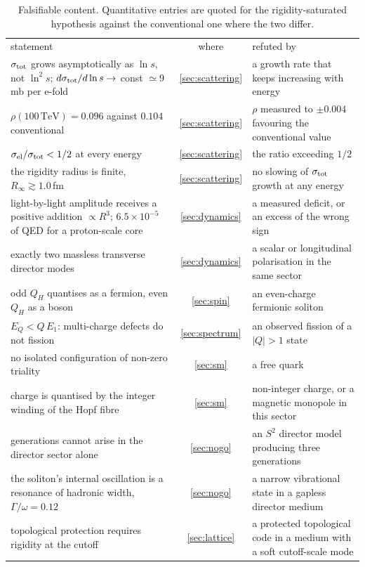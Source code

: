 \documentclass[aps,prd,preprint,nofootinbib,longbibliography]{revtex4-2}
\newcommand{\Qh}{Q_H}
\begin{document}
\begin{table}[p]
\footnotesize
\caption{Falsifiable content. Quantitative entries are quoted for the
rigidity-saturated hypothesis against the conventional one where the two differ.}
\label{tab:falsify}
\begin{ruledtabular}
\begin{tabular}{p{}cp{}}
statement & where & \raggedright refuted by \tabularnewline
\colrule
\raggedright $\sigma_{\rm tot}$ grows asymptotically as $\ln s$, not $\ln^2 s$;
$d\sigma_{\rm tot}/d\ln s\to$ const $\simeq9\,$mb per e-fold
 & \ref{sec:scattering} & \raggedright a growth rate that keeps increasing with
   energy \tabularnewline
\raggedright $\rho(100\,\mathrm{TeV})=0.096$ against $0.104$ conventional
 & \ref{sec:scattering} & \raggedright $\rho$ measured to $\pm0.004$ favouring
   the conventional value \tabularnewline
\raggedright $\sigma_{\rm el}/\sigma_{\rm tot}<1/2$ at every energy
 & \ref{sec:scattering} & \raggedright the ratio exceeding $1/2$ \tabularnewline
\raggedright the rigidity radius is finite, $R_\infty\gtrsim1.0\,$fm
 & \ref{sec:scattering} & \raggedright no slowing of $\sigma_{\rm tot}$ growth at
   any energy \tabularnewline
\raggedright light-by-light amplitude receives a positive addition $\propto R^3$;
$6.5\times10^{-5}$ of QED for a proton-scale core
 & \ref{sec:dynamics} & \raggedright a measured deficit, or an excess of the
   wrong sign \tabularnewline
\raggedright exactly two massless transverse director modes
 & \ref{sec:dynamics} & \raggedright a scalar or longitudinal polarisation in the
   same sector \tabularnewline
\raggedright odd $\Qh$ quantises as a fermion, even $\Qh$ as a boson
 & \ref{sec:spin} & \raggedright an even-charge fermionic soliton \tabularnewline
\raggedright $E_Q<Q\,E_1$: multi-charge defects do not fission
 & \ref{sec:spectrum} & \raggedright an observed fission of a $|Q|>1$ state
   \tabularnewline
\raggedright no isolated configuration of non-zero triality
 & \ref{sec:sm} & \raggedright a free quark \tabularnewline
\raggedright charge is quantised by the integer winding of the Hopf fibre
 & \ref{sec:sm} & \raggedright non-integer charge, or a magnetic monopole in this
   sector \tabularnewline
\raggedright generations cannot arise in the director sector alone
 & \ref{sec:nogo} & \raggedright an $S^2$ director model producing three
   generations \tabularnewline
\raggedright the soliton's internal oscillation is a resonance of hadronic
width, $\Gamma/\omega=0.12$
 & \ref{sec:nogo} & \raggedright a narrow vibrational state in a gapless
   director medium \tabularnewline
\raggedright topological protection requires rigidity at the cutoff
 & \ref{sec:lattice} & \raggedright a protected topological code in a medium with
   a soft cutoff-scale mode \tabularnewline
\end{tabular}
\end{ruledtabular}
\end{table}
\end{document}
